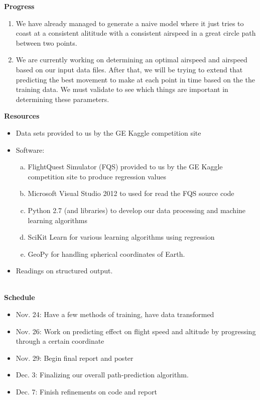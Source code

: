 \documentclass{article}[9pt]
\begin{document}
\noindent
\Large{\textbf{Progress}}
\begin{enumerate}
		\item We have already managed to generate a naive model where it just tries to coast at a consistent alititude with a consistent airspeed in a great circle path between two points.
		\item We are currently working on determining an optimal airspeed and airspeed based on our input data files. After that, we will be trying to extend that predicting the best movement to make at each point in time based on the the training data. We must validate to see which things are important in determining these parameters.
\end{enumerate}
\noindent
\Large{\textbf{Resources}}
\begin{itemize}
    \item Data sets provided to us by the GE Kaggle competition site
    \item Software: 
        \begin{enumerate}[(a)]
            \item FlightQuest Simulator (FQS) provided to us by the GE Kaggle competition site to produce regression values
            \item Microsoft Visual Studio 2012 to used for read the FQS source code
            \item Python 2.7 (and libraries) to develop our data processing and machine learning algorithms
            \item SciKit Learn for various learning algorithms using regression
            \item GeoPy for handling spherical coordinates of Earth.
        \end{enumerate}
    \item Readings on structured output. 
   \end{itemize}
\hspace*{\fill}\\
\Large{\textbf{Schedule}}
\noindent
\begin{itemize}
	\item Nov. 24: Have a few methods of training, have data transformed
	\item Nov. 26: Work on predicting effect on flight speed and altitude by progressing through a certain coordinate
	\item Nov. 29: Begin final report and poster
	\item Dec. 3: Finalizing our overall path-prediction algorithm.
	\item Dec. 7: Finish refinements on code and report 
\end{itemize}
\end{document}
